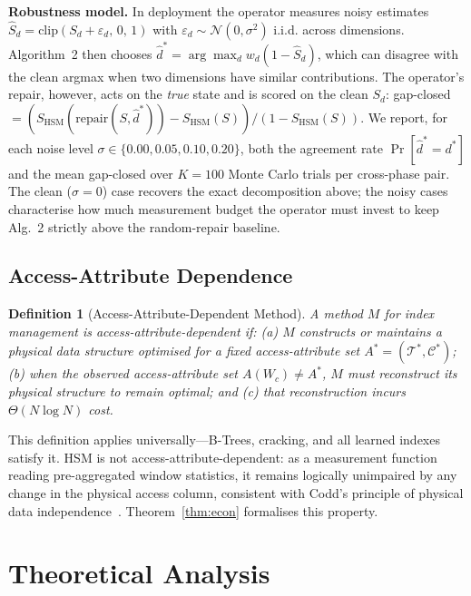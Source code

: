 \documentclass[10pt,twocolumn,a4paper]{article}
\newtheorem{definition}{Definition}
\newcommand{\SHSM}{S_{\mathrm{HSM}}}
\begin{document}
\smallskip\noindent\textbf{Robustness model.}
In deployment the operator measures noisy estimates
$\hat S_d = \mathrm{clip}(S_d+\varepsilon_d,\,0,\,1)$ with
$\varepsilon_d\!\sim\!\mathcal{N}(0,\sigma^2)$ i.i.d. across dimensions.
Algorithm~2 then chooses
$\hat d^{*}=\arg\max_d w_d(1-\hat S_d)$, which can disagree with the
clean argmax when two dimensions have similar contributions. The
operator's repair, however, acts on the \emph{true} state and is scored
on the clean $S_d$: gap-closed
$=(\SHSM(\mathrm{repair}(S,\hat d^{*}))-\SHSM(S))/(1-\SHSM(S))$.
We report, for each noise level
$\sigma\in\{0.00,0.05,0.10,0.20\}$, both the agreement rate
$\Pr[\hat d^{*}\!=\!d^{*}]$ and the mean gap-closed over $K=100$ Monte
Carlo trials per cross-phase pair. The clean ($\sigma\!=\!0$)
case recovers the exact decomposition above; the noisy cases
characterise how much measurement budget the operator must invest
to keep Alg.~2 strictly above the random-repair baseline.

\subsection{Access-Attribute Dependence}

\begin{definition}[Access-Attribute-Dependent Method]
A method $M$ for index management is \emph{access-attribute-dependent} if:
(a) $M$ constructs or maintains a physical data structure optimised for a
fixed access-attribute set $A^*\!=\!(\mathcal{T}^*,\mathcal{C}^*)$;
(b) when the observed access-attribute set $A(W_c)\neq A^*$, $M$ must
reconstruct its physical structure to remain optimal; and
(c) that reconstruction incurs $\Theta(N\log N)$ cost.
\end{definition}

This definition applies universally---B-Trees, cracking, and all learned
indexes satisfy it. HSM is not access-attribute-dependent: as a
measurement function reading pre-aggregated window statistics, it remains
logically unimpaired by any change in the physical access column,
consistent with Codd's principle of physical data
independence~\cite{Codd1970Relational}. Theorem~\ref{thm:econ}
formalises this property.

\section{Theoretical Analysis}
\end{document}
